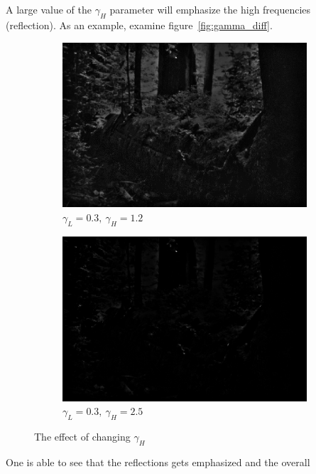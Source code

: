 		\\
		\\
		A large value of the $\gamma_H$ parameter 
		will emphasize the high frequencies (reflection). As an example, 
		examine figure~\ref{fig:gamma_diff}.
		\begin{figure}[h!]
			\centering
			\begin{subfigure}[b]{0.5\linewidth}
				\includegraphics[width=0.9\linewidth]{pics/non_emph_high_frequnces.png}
				\caption{$\gamma_L = 0.3,~\gamma_H = 1.2$}
				\label{fig:high_freq_non_emph}
			\end{subfigure}%
			\begin{subfigure}[b]{0.5\linewidth}
				\includegraphics[width=0.9\linewidth]{pics/emph_high_frequnces.png}
				\caption{$\gamma_L = 0.3,~\gamma_H = 2.5$}
				\label{fig:high_freq_emph}
			\end{subfigure}
			\label{fig:high_gamma}
		\caption{The effect of changing $\gamma_H$}				
		\end{figure}		
		One is able to see that the reflections gets emphasized and the overall
